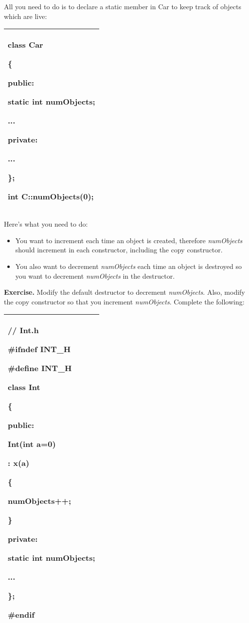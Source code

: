 \documentclass[
]{article}
\providecommand{\tightlist}{%
  \setlength{\itemsep}{0pt}\setlength{\parskip}{0pt}}
\begin{document}
All you need to do is to declare a static member in Car to keep track of
objects which are live:

\begin{longtable}[]{@{}l@{}}
\toprule
\endhead
\begin{minipage}[t]{0.97\columnwidth}\raggedright
class Car

\{

public:

static int numObjects;

...

private:

...

\};

int C::numObjects(0);\strut
\end{minipage}\tabularnewline
\bottomrule
\end{longtable}

Here's what you need to do:

\begin{itemize}
\tightlist
\item
  You want to increment each time an object is created, therefore
  \emph{numObjects} should increment in each constructor, including the
  copy constructor.
\item
  You also want to decrement \emph{numObjects} each time an object is
  destroyed so you want to decrement \emph{numObjects} in the
  destructor.
\end{itemize}

\textbf{Exercise.} Modify the default destructor to decrement
\emph{numObjects}. Also, modify the copy constructor so that you
increment \emph{numObjects}. Complete the following:

\begin{longtable}[]{@{}l@{}}
\toprule
\endhead
\begin{minipage}[t]{0.97\columnwidth}\raggedright
// Int.h

\#ifndef INT\_H

\#define INT\_H

class Int

\{

public:

Int(int a=0)

: x(a)

\{

numObjects++;

\}

private:

static int numObjects;

...

\};

\#endif\strut
\end{minipage}\tabularnewline
\bottomrule
\end{longtable}
\end{document}
